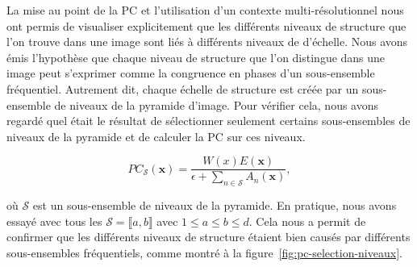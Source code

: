 La mise au point de la PC et l'utilisation d'un contexte multi-résolutionnel nous ont permis de visualiser explicitement que les différents niveaux de structure que l'on trouve dans une image sont liés à différents niveaux de d'échelle. Nous avons émis l'hypothèse que chaque niveau de structure que l'on distingue dans une image peut s'exprimer comme la congruence en phases d'un sous-ensemble fréquentiel. Autrement dit, chaque échelle de structure est créée par un sous-ensemble de niveaux de la pyramide d'image. Pour vérifier cela, nous avons regardé quel était le résultat de sélectionner seulement certains sous-ensembles de niveaux de la pyramide et de calculer la PC sur ces niveaux.

\begin{equation}
    PC_{\mathcal{S}}(\mathbf{x}) = \frac{W(x)E(\mathbf{x})}{\epsilon + \sum_{n\in\mathcal{S}} A_{n}(\mathbf{x})},
\end{equation}

où $\mathcal{S}$ est un sous-ensemble de niveaux de la pyramide. En pratique, nous avons essayé avec tous les $\mathcal{S} = \llbracket a, b\rrbracket$ avec $1 \leq a \leq b \leq d$. Cela nous a permit de confirmer que les différents niveaux de structure étaient bien causés par différents sous-ensembles fréquentiels, comme montré à la figure~\ref{fig:pc-selection-niveaux}.

\bigskip

